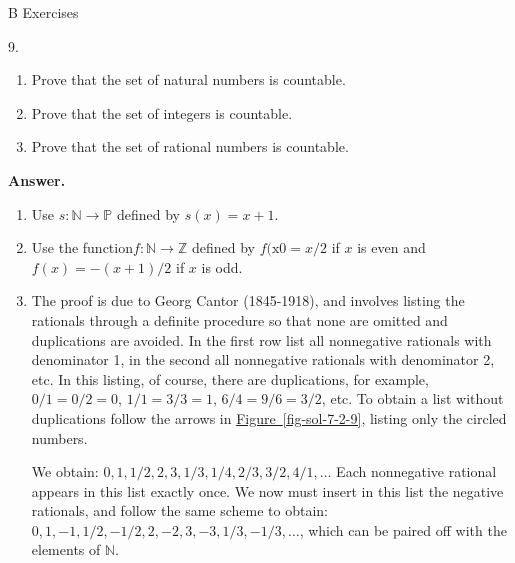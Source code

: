 \documentclass[10pt,]{book}
\theoremstyle{plain}
\theoremstyle{definition}
\theoremstyle{definition}
\theoremstyle{definition}
\begin{document}
\par\smallskip\noindent
\hypertarget{exercisegroup-4}{}\typeout{************************************************}
\typeout{************************************************}
B Exercises%
\begin{exercisegroup}
\item[9.]\hypertarget{exercise-17}{}\leavevmode%
\begin{enumerate}[label=\alph*]
\item\hypertarget{li-59}{} Prove that the set of natural numbers is countable.%
\item\hypertarget{li-60}{}Prove that the set of integers is countable.%
\item\hypertarget{li-61}{}Prove that the set of rational numbers is countable.%
\end{enumerate}
%
\par\smallskip
\par\smallskip
\noindent\textbf{Answer.}\hypertarget{answer-8}{}\quad
\leavevmode%
\begin{enumerate}[label=\alph*]
\item\hypertarget{li-62}{} Use \(s:\mathbb{N}\to \mathbb{P}\) defined by \(s(x)=x+1\).%
\item\hypertarget{li-63}{} Use the function\(f:\mathbb{N}\to \mathbb{Z}\) defined by \(f(\text{x0}=x/2\) if \(x\) is even and \(f(x)=-(x+1)/2\) if \(x\) is odd.%
\item\hypertarget{li-64}{}The proof is due to Georg Cantor (1845-1918), and involves listing the rationals
 through a definite procedure so that none are omitted and duplications are avoided.
  In the first row list all nonnegative rationals with denominator 1,
   in the second all nonnegative rationals with denominator 2, etc.
    In this listing, of course, there are duplications, for example, \(0/1=0/2=0\),
     \(1/1=3/3=1\), \(6/4=9/6=3/2\), etc. To obtain a list without duplications follow the arrows in \hyperref[fig-sol-7-2-9]{Figure~\ref{fig-sol-7-2-9}}, listing only the circled numbers.%
\par
We obtain: \(0,1,1/2,2,3,1/3,1/4,2/3,3/2,4/1,\ldots\) Each nonnegative rational appears in this list exactly once.
  We now must insert in this list the negative rationals, and follow the same scheme to obtain:
   \(0,1,-1,1/2,-1/2,2,-2,3,-3,1/3,-1/3, \ldots\), which can be paired off with the elements of \(\mathbb{N}\).%
\end{enumerate}
%
\leavevmode%
\begin{figure}

\end{figure}
\end{exercisegroup}
\end{document}
